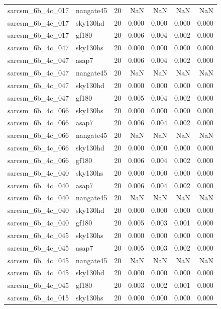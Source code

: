 \begin{tabular}{llrrrrr}
sarcsm\_6b\_4c\_017 & nangate45 & 20 & NaN & NaN & NaN & NaN \\
sarcsm\_6b\_4c\_017 & sky130hd & 20 & 0.000 & 0.000 & 0.000 & 0.000 \\
sarcsm\_6b\_4c\_017 & gf180 & 20 & 0.006 & 0.004 & 0.002 & 0.000 \\
sarcsm\_6b\_4c\_047 & sky130hs & 20 & 0.000 & 0.000 & 0.000 & 0.000 \\
sarcsm\_6b\_4c\_047 & asap7 & 20 & 0.006 & 0.004 & 0.002 & 0.000 \\
sarcsm\_6b\_4c\_047 & nangate45 & 20 & NaN & NaN & NaN & NaN \\
sarcsm\_6b\_4c\_047 & sky130hd & 20 & 0.000 & 0.000 & 0.000 & 0.000 \\
sarcsm\_6b\_4c\_047 & gf180 & 20 & 0.005 & 0.004 & 0.002 & 0.000 \\
sarcsm\_6b\_4c\_066 & sky130hs & 20 & 0.000 & 0.000 & 0.000 & 0.000 \\
sarcsm\_6b\_4c\_066 & asap7 & 20 & 0.006 & 0.004 & 0.002 & 0.000 \\
sarcsm\_6b\_4c\_066 & nangate45 & 20 & NaN & NaN & NaN & NaN \\
sarcsm\_6b\_4c\_066 & sky130hd & 20 & 0.000 & 0.000 & 0.000 & 0.000 \\
sarcsm\_6b\_4c\_066 & gf180 & 20 & 0.006 & 0.004 & 0.002 & 0.000 \\
sarcsm\_6b\_4c\_040 & sky130hs & 20 & 0.000 & 0.000 & 0.000 & 0.000 \\
sarcsm\_6b\_4c\_040 & asap7 & 20 & 0.006 & 0.004 & 0.002 & 0.000 \\
sarcsm\_6b\_4c\_040 & nangate45 & 20 & NaN & NaN & NaN & NaN \\
sarcsm\_6b\_4c\_040 & sky130hd & 20 & 0.000 & 0.000 & 0.000 & 0.000 \\
sarcsm\_6b\_4c\_040 & gf180 & 20 & 0.005 & 0.003 & 0.001 & 0.000 \\
sarcsm\_6b\_4c\_045 & sky130hs & 20 & 0.000 & 0.000 & 0.000 & 0.000 \\
sarcsm\_6b\_4c\_045 & asap7 & 20 & 0.005 & 0.003 & 0.002 & 0.000 \\
sarcsm\_6b\_4c\_045 & nangate45 & 20 & NaN & NaN & NaN & NaN \\
sarcsm\_6b\_4c\_045 & sky130hd & 20 & 0.000 & 0.000 & 0.000 & 0.000 \\
sarcsm\_6b\_4c\_045 & gf180 & 20 & 0.003 & 0.002 & 0.001 & 0.000 \\
sarcsm\_6b\_4c\_015 & sky130hs & 20 & 0.000 & 0.000 & 0.000 & 0.000 \\

\end{tabular}

